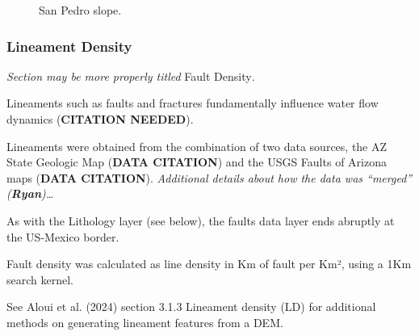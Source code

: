 \documentclass[
]{agujournal2019}
\begin{document}
\begin{figure}
{}

\caption{\label{fig-slope}San Pedro slope.}

\end{figure}%

\subsubsection{Lineament Density}\label{lineament-density}

\begin{tcolorbox}[enhanced jigsaw, coltitle=black, opacityback=0, colframe=quarto-callout-note-color-frame, colbacktitle=quarto-callout-note-color!10!white, bottomrule=.15mm, leftrule=.75mm, toprule=.15mm, breakable, colback=white, title=\textcolor{quarto-callout-note-color}{\faInfo}\hspace{0.5em}{Note}, bottomtitle=1mm, left=2mm, opacitybacktitle=0.6, rightrule=.15mm, toptitle=1mm, titlerule=0mm, arc=.35mm]

\emph{Section may be more properly titled} Fault Density\emph{.}

\end{tcolorbox}

Lineaments such as faults and fractures fundamentally influence water
flow dynamics (\textbf{CITATION NEEDED}).

Lineaments were obtained from the combination of two data sources, the
AZ State Geologic Map (\textbf{DATA CITATION}) and the USGS Faults of
Arizona maps (\textbf{DATA CITATION}). \emph{Additional details about
how the data was ``merged'' (\textbf{Ryan})\ldots{}}

As with the Lithology layer (see below), the faults data layer ends
abruptly at the US-Mexico border.

Fault density was calculated as line density in Km of fault per Km²,
using a 1Km search kernel.

See Aloui et al. (2024) section 3.1.3 Lineament density (LD) for
additional methods on generating lineament features from a DEM.
\end{document}
